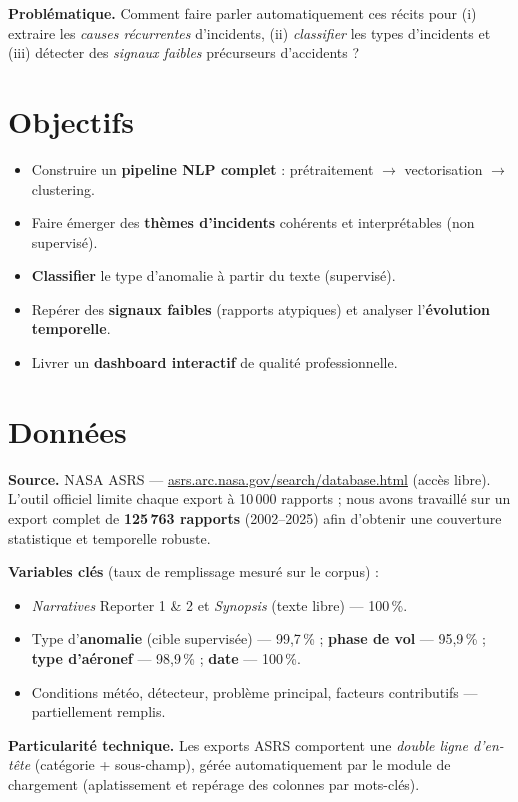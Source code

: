 \documentclass[11pt,a4paper]{article}
\begin{document}
\medskip
\noindent\textbf{Problématique.} Comment faire parler automatiquement ces récits
pour (i) extraire les \emph{causes récurrentes} d'incidents, (ii) \emph{classifier}
les types d'incidents et (iii) détecter des \emph{signaux faibles} précurseurs
d'accidents ?

\section{Objectifs}
\begin{itemize}[leftmargin=1.4em]
  \item Construire un \textbf{pipeline NLP complet} : prétraitement $\rightarrow$ vectorisation $\rightarrow$ clustering.
  \item Faire émerger des \textbf{thèmes d'incidents} cohérents et interprétables (non supervisé).
  \item \textbf{Classifier} le type d'anomalie à partir du texte (supervisé).
  \item Repérer des \textbf{signaux faibles} (rapports atypiques) et analyser l'\textbf{évolution temporelle}.
  \item Livrer un \textbf{dashboard interactif} de qualité professionnelle.
\end{itemize}

\section{Données}
\textbf{Source.} NASA ASRS — \url{asrs.arc.nasa.gov/search/database.html} (accès libre).
L'outil officiel limite chaque export à 10\,000 rapports ; nous avons travaillé sur
un export complet de \textbf{125\,763 rapports} (2002–2025) afin d'obtenir une
couverture statistique et temporelle robuste.

\smallskip
\noindent\textbf{Variables clés} (taux de remplissage mesuré sur le corpus) :
\begin{itemize}[leftmargin=1.4em,nosep]
  \item \emph{Narratives} Reporter 1 \& 2 et \emph{Synopsis} (texte libre) — 100\,\%.
  \item Type d'\textbf{anomalie} (cible supervisée) — 99,7\,\% ; \textbf{phase de vol} — 95,9\,\% ; \textbf{type d'aéronef} — 98,9\,\% ; \textbf{date} — 100\,\%.
  \item Conditions météo, détecteur, problème principal, facteurs contributifs — partiellement remplis.
\end{itemize}
\noindent\textbf{Particularité technique.} Les exports ASRS comportent une
\emph{double ligne d'en-tête} (catégorie + sous-champ), gérée automatiquement par
le module de chargement (aplatissement et repérage des colonnes par mots-clés).
\end{document}
